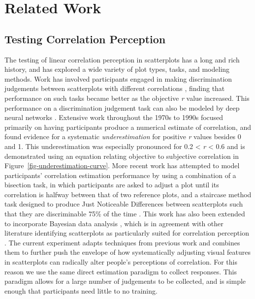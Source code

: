 \documentclass[manuscript, review, anonymous, screen]{acmart}
\begin{document}
\hypertarget{sec-related-work}{%
\section{Related Work}\label{sec-related-work}}

\hypertarget{sec-testing-corr-percept}{%
\subsection{Testing Correlation
Perception}\label{sec-testing-corr-percept}}

The testing of linear correlation perception in scatterplots has a long
and rich history, and has explored a wide variety of plot types, tasks,
and modeling methods. Work has involved participants engaged in making
discrimination judgements between scatterplots with different
correlations \citep{pollack_1960, doherty_2007}, finding that
performance on such tasks became better as the objective \emph{r} value
increased. This performance on a discrimination judgement task can also
be modeled by deep neural networks \citep{yang_2023}. Extensive work
throughout the 1970s to 1990s focused primarily on having participants
produce a numerical estimate of correlation, and found evidence for a
systematic \emph{underestimation} for positive \emph{r} values besides 0
and 1. This underestimation was especially pronounced for 0.2
\textless{} \emph{r} \textless{} 0.6
\citep{strahan_1978, bobko_1979, cleveland_1982, lane_1985, lauer_1989, collyer_1990, meyer_1992}
and is demonstrated using an equation relating objective to subjective
correlation \citep{rensink_2017} in
Figure~\ref{fig-underestimation-curve}. More recent work has attempted
to model participants' correlation estimation performance by using a
combination of a bisection task, in which participants are asked to
adjust a plot until its correlation is halfway between that of two
reference plots, and a staircase method task designed to produce Just
Noticeable Differences between scatterplots such that they are
discriminable 75\% of the time \citep{rensink_2010}. This work has also
been extended to incorporate Bayesian data analysis \citep{kay_2015},
which is in agreement with other literature identifying scatterplots as
particularly suited for correlation perception \citep{li_2010}. The
current experiment adapts techniques from previous work
\citep{strain_2023, strain_2023b} and combines them to further push the
envelope of how systematically adjusting visual features in scatterplots
can radically alter people's perceptions of correlation. For this reason
we use the same direct estimation paradigm to collect responses. This
paradigm allows for a large number of judgements to be collected, and is
simple enough that participants need little to no training.
\end{document}
